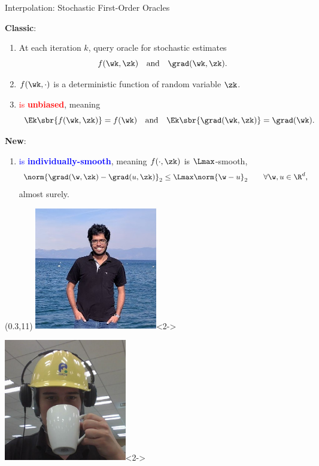 \documentclass[mathserif,notheorems, hyperref={colorlinks, citecolor=blue, urlcolor=blue, linkcolor=blue}]{beamer}
\begin{document}
    \begin{frame}{Interpolation: Stochastic First-Order Oracles}

        \textbf{Classic}:
        \begin{enumerate}
            \item At each iteration \( k \), query oracle \oracle{} for stochastic estimates 
                \[ f(\wk, \zk) \quad \text{and} \quad \grad(\wk, \zk). \] 
            \item \( f(\wk, \cdot) \) is a deterministic function of random variable \( \zk \). 
                \vspace{1ex}
            \item \textcolor{red}{\oracle{} is \textbf{unbiased}}, meaning 
            \[ \Ek\sbr{f(\wk, \zk)} = f(\wk) \quad \text{and} \quad \Ek\sbr{\grad(\wk, \zk)} = \grad(\wk). \]%
        \end{enumerate}%
        \pause%
        \textbf{New}:
        \begin{enumerate}
            \item \textcolor{blue}{\oracle{} is \textbf{individually-smooth}}, meaning \( f(\cdot, \zk) \) is \( \Lmax \)-smooth, 
                \begin{align*}
                    \norm{\grad(\w, \zk) - \grad(u, \zk)}_2 &\leq \Lmax \norm{\w - u}_2 \tag*{\(\forall \w, u \in \R^d \),} 
                \end{align*}
                almost surely.
        \end{enumerate}

    \begin{textblock}{2.5}(0.3,11)
        \includegraphics[width=0.4\textwidth]{collaborators/sharan}<2->

        \vspace{0.5ex}

        \includegraphics[width=0.4\textwidth]{collaborators/fred}<2->
    \end{textblock}

    \end{frame}
\end{document}
